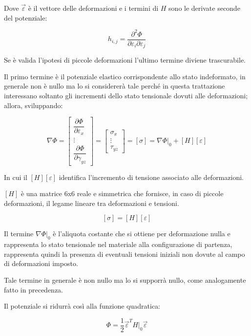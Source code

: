 \documentclass{article}
\begin{document}
\begin{adjustwidth}{2in}{}
	Dove $\vec{\varepsilon}$ è il vettore delle deformazioni e i termini di $H$ sono le derivate seconde del potenziale: 
	
	\[
	h_{i,j} = \frac{\partial^2 \Phi}{\partial \varepsilon_i \partial \varepsilon_j}
	\]
	
	Se è valida l’ipotesi di piccole deformazioni l’ultimo termine diviene trascurabile. \newline
	
	Il primo termine è il potenziale elastico corrispondente allo stato indeformato, in generale
	non è nullo ma lo si considererà tale perché in questa trattazione interessano soltanto gli incrementi dello stato tensionale dovuti alle
	deformazioni; allora, sviluppando: 
	
	\[
	\nabla\Phi = \left[ \begin{array}{c}
		\dfrac{\partial \Phi}{\partial \varepsilon_x} \\
		\vdots \\
		\dfrac{\partial \Phi}{\partial \gamma_{yz}}
	\end{array}\right] = 	\left[ \begin{array}{c}
	\sigma_x \\
	\vdots \\
	\tau_{yz}
	\end{array}\right] = [\sigma] = \nabla \Phi|_0 + [H][\varepsilon]
	\]
	
	In cui il $[H][\varepsilon]$ identifica l'incremento di tensione associato alle deformazioni. \newline
	
	$ [H] $ è una matrice 6x6 reale e simmetrica che fornisce, in caso di piccole deformazioni, il legame lineare tra
	deformazioni e tensioni.
	
	\[
	[\sigma] = [H][\varepsilon]
	\]
	
	Il termine $ \nabla\Phi|_0 $ è l’aliquota costante che si ottiene per deformazione nulla e rappresenta lo stato tensionale nel materiale alla configurazione di
	partenza, rappresenta quindi la presenza di eventuali tensioni iniziali non dovute al campo di deformazioni imposto. \newline
	
	Tale termine in generale è non nullo ma lo si supporrà nullo, come analogamente fatto in
	precedenza. \newline
	
	Il potenziale si ridurrà così alla funzione quadratica:
	
	\[
	\Phi = \frac{1}{2} \vec{\varepsilon}^T H|_0 \vec{\varepsilon}
	\]


\end{adjustwidth}
\end{document}
